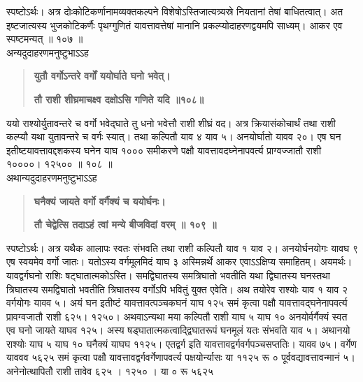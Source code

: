 \documentclass[11pt, openany]{book}
\begin{document}
\begin{sloppypar}
\hangindent=0.2in \hspace{0.2in}स्पष्टोऽर्थः। अत्र दोःकोटिकर्णानामव्यक्तकल्पने विशेषोऽस्तिजात्यत्र्यस्रे नियतानां तेषां बाधितत्वात्। अत इष्टजात्यस्य भुजकोटिकर्णैः पृथग्गुणितं यावत्तावत्तेषां मानानि प्रकल्प्योदाहरणद्वयमपि साध्यम्। आकर एव स्पष्टमन्यत् ॥ १०७ ॥\\

\hangindent=0.2in \hspace{0.2in}अन्यदुदाहरणमनुष्टुभाऽऽह\textendash

\begin{quote}
\hspace{1in}\textbf{युतौ वर्गोऽन्तरे वर्गों ययोर्घाते घनो भवेत्।}

\hspace{1in}\textbf{तौ राशी शीघ्रमाचक्ष्व दक्षोऽसि गणिते यदि ॥१०८॥}
\end{quote}

\hangindent=0.2in \hspace{0.2in}ययो राश्योर्युतावन्तरे च वर्गो भवेद्घाते तु धनो भवेत्तौ राशी शीघ्रं वद। अत्र क्रियासंकोचार्थं तथा राशी कल्प्यौ यथा युतावन्तरे च वर्गः स्यात्। तथा कल्पितौ याव ४ याव ५। अनयोर्घातो यावव २०। एष घन इतीष्टयावत्तावद्दशकस्य घनेन याघ १००० समीकरणे पक्षौ यावत्तावदघ्नेनापवर्त्य प्राग्वज्जातौ राशी १००००। १२५०० ॥ १०८ ॥\\

\hangindent=0.2in \hspace{0.2in}अथान्यदुदाहरणमनुष्टुभाऽऽह\textendash

\begin{quote}
\hspace{1in}\textbf{घनैक्यं जायते वर्गो वर्गैक्यं च ययोर्घनः।}

\hspace{1in}\textbf{तौ चेद्वेत्सि तदाऽहं त्वां मन्ये बीजविदां वरम् ॥ १०९ ॥}
\end{quote}

\hangindent=0.2in \hspace{0.2in}स्पष्टोऽर्थः। अत्र यथैक आलापः स्वतः संभवति तथा राशी कल्पितौ याव १ याव २। अनयोर्घनयोगः यावघ ९ एष स्वयमेव वर्गो जातः। यतोऽस्य वर्गमूलमिदं याघ ३ अस्मिन्नर्थे आकर एवाऽऽक्षिप्य समाहितम्। अयमर्थः। यावद्वर्गघनो राशिः षट्घातात्मकोऽस्ति। समद्विघातस्य समत्रिघातो भवतीति यथा द्विघातस्य घनस्तथा त्रिघातस्य समद्विघातो भवतीति त्रिघातस्य वर्गोऽपि भवितुं युक्त एवेति। अथ तयोरेव राश्योः याव १ याव २ वर्गयोगः यावव ५। अयं घन इतीष्टं यावत्तावत्पञ्चकघनं याघ १२५ समं कृत्वा पक्षौ यावत्तावद्घनेनापवर्त्य प्रावग्वजातौ राशी ६२५। १२५०। अथवाऽन्यथा मया कल्पितौ राशी याघ ५ याघ १० अनयोर्वर्गैक्यं स्वत एव घनो जायते याघव १२५। अस्य षड्घातात्मकत्वाद्द्विघातरूपं घनमूलं यतः संभवति याव ५। अथानयो राश्योः याघ ५ याघ १० घनैक्यं याघघ ११२५। एतद्वर्ग इति यावत्तावद्वर्गवर्गपञ्चसप्ततिः। यावव ७५। वर्गेण याववव ५६२५ समं कृत्वा पक्षौ यावत्तावद्वर्गवर्गेणापवर्त्य पक्षयोर्न्यासः या ११२५ रू ० पूर्ववद्यावत्तावन्मानं ५। अनेनोत्थापितौ राशी तावेव ६२५ । १२५० । या ० रू ५६२५
\end{sloppypar}
\thispagestyle{empty}
\newpage
\end{document}
